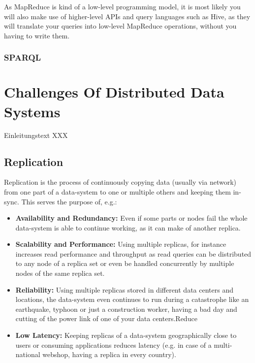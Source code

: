 {As MapReduce is kind of a low-level programming model, it is most likely you will also make use of higher-level APIs and query languages such as Hive, as they will translate your queries into low-level MapReduce operations, without you having to write them. 


\subsubsection{SPARQL}
\label{tf_dma_dataaccess_sparql}

\newpage

\section{Challenges Of Distributed Data Systems}
\label{tf_dds}
Einleitungstext XXX

\subsection{Replication}
\label{tf_dds_replication}
Replication is the process of continuously copying data (usually via network) from one part of a data-system to one or multiple others and keeping them in-sync. This serves the purpose of, e.g.:
\begin{itemize}
\item \textbf{Availability and Redundancy:} Even if some parts or nodes fail the whole data-system is able to continue working, as it can make of another replica.
\item \textbf{Scalability and Performance:} Using multiple replicas, for instance increases read performance and throughput as read queries can be distributed to any node of a replica set or even be handled concurrently by multiple nodes of the same replica set.
\item \textbf{Reliability:} Using multiple replicas stored in different data centers and locations, the data-system even continues to run during a catastrophe like an earthquake, typhoon or just a construction worker, having a bad day and cutting of the power link of one of your data centers.Reduce 
\item \textbf{Low Latency: } Keeping replicas of a data-system geographically close to users or consuming applications reduces latency (e.g. in case of a multi-national webshop, having a replica in every country). \\
\end{itemize}

}
